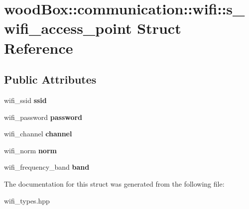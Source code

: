 \hypertarget{structwood_box_1_1communication_1_1wifi_1_1s__wifi__access__point}{}\section{wood\+Box\+:\+:communication\+:\+:wifi\+:\+:s\+\_\+wifi\+\_\+access\+\_\+point Struct Reference}
\label{structwood_box_1_1communication_1_1wifi_1_1s__wifi__access__point}
\subsection*{Public Attributes}
\begin{DoxyCompactItemize}
\item 
\mbox{\label{structwood_box_1_1communication_1_1wifi_1_1s__wifi__access__point_ac5bbb7d91e2794c134b8e3f166c9d2ab}} 
wifi\+\_\+ssid {\bfseries ssid}
\item 
\mbox{\label{structwood_box_1_1communication_1_1wifi_1_1s__wifi__access__point_a0a706e0c1992ea3b1ef539497a6d818e}} 
wifi\+\_\+password {\bfseries password}
\item 
\mbox{\label{structwood_box_1_1communication_1_1wifi_1_1s__wifi__access__point_a6729c2e3c331f4946a64120bc88032bc}} 
wifi\+\_\+channel {\bfseries channel}
\item 
\mbox{\label{structwood_box_1_1communication_1_1wifi_1_1s__wifi__access__point_a9a629ae193603ac7de1c846b7e093d7d}} 
wifi\+\_\+norm {\bfseries norm}
\item 
\mbox{\label{structwood_box_1_1communication_1_1wifi_1_1s__wifi__access__point_a02c57a98f9ad2ada4a966ddd4cbc80c2}} 
wifi\+\_\+frequency\+\_\+band {\bfseries band}
\end{DoxyCompactItemize}


The documentation for this struct was generated from the following file\+:\begin{DoxyCompactItemize}
\item 
wifi\+\_\+types.\+hpp\end{DoxyCompactItemize}
